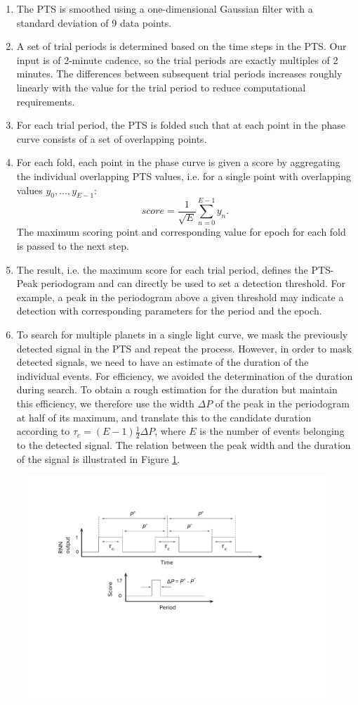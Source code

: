 \begin{enumerate}
    \item The PTS is smoothed using a one-dimensional Gaussian filter with a standard deviation of 9 data points.
    \item A set of trial periods is determined based on the time steps in the PTS. Our input is of 2-minute cadence, so the trial periods are exactly multiples of 2 minutes. The differences between subsequent trial periods increases roughly linearly with the value for the trial period to reduce computational requirements.
    \item For each trial period, the PTS is folded such that at each point in the phase curve consists of a set of overlapping points. 
    \item For each fold, each point in the phase curve is given a score by aggregating the individual overlapping PTS values, i.e. for a single point with overlapping values $y_0,\dots,y_{E-1}$:
    \begin{equation}
        score = \frac{1}{\sqrt{E}} \sum_{n=0}^{E-1}y_n.
    \end{equation}
    The maximum scoring point and corresponding value for epoch for each fold is passed to the next step. 
    \item The result, i.e. the maximum score for each trial period, defines the PTS-Peak periodogram and can directly be used to set a detection threshold. For example, a peak in the periodogram above a given threshold may indicate a detection with corresponding parameters for the period and the epoch.
    \item To search for multiple planets in a single light curve, we mask the previously detected signal in the PTS and repeat the process. However, in order to mask detected signals, we need to have an estimate of the duration of the individual events. For efficiency, we avoided the determination of the duration during search. To obtain a rough estimation for the duration but maintain this efficiency, we therefore use the width $\Delta P$ of the peak in the periodogram at half of its maximum, and translate this to the candidate duration according to $\tau_c = (E-1)\frac{1}{2}\Delta P$, where $E$ is the number of events belonging to the detected signal. The relation between the peak width and the duration of the signal is illustrated in Figure \ref{fig:fold_drawing}.
    
    
\end{enumerate}


\begin{figure}
    \centering
    \includegraphics[width=0.6\linewidth]{Methodology/Figures/fold_drawing.pdf}
    \caption{}
    \label{fig:fold_drawing}
\end{figure}